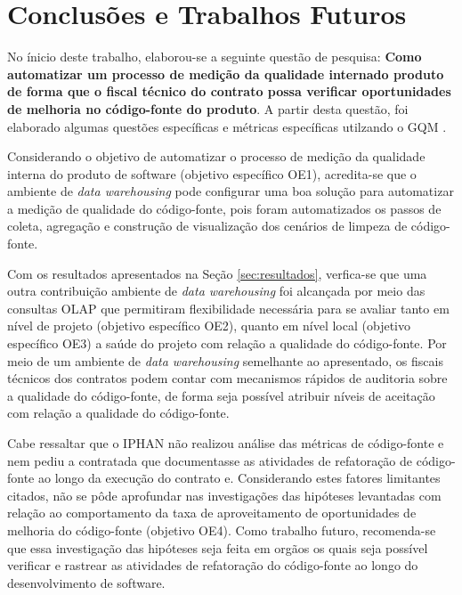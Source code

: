\section{Conclusões e Trabalhos Futuros}

No ínicio deste trabalho, elaborou-se a seguinte questão de pesquisa: \textbf{Como automatizar um processo de medição da qualidade internado produto de forma que o fiscal técnico do contrato possa verificar oportunidades de melhoria no código-fonte do produto}. A partir desta questão, foi elaborado algumas questões específicas e métricas específicas utilzando o GQM \cite{Basili96b}.

Considerando o objetivo de automatizar o processo de medição da qualidade interna do produto de software (objetivo específico OE1), acredita-se que o ambiente de \textit{data warehousing} pode configurar uma boa solução para automatizar a medição de qualidade do código-fonte, pois foram automatizados os passos de coleta, agregação e construção de visualização dos cenários de limpeza de código-fonte.

Com os resultados apresentados na Seção \ref{sec:resultados}, verfica-se que uma outra contribuição ambiente de \textit{data warehousing} foi alcançada por meio das consultas OLAP que permitiram flexibilidade necessária para se avaliar tanto em nível de projeto (objetivo específico OE2), quanto em nível local (objetivo específico OE3) a saúde do projeto com relação a qualidade do código-fonte. Por meio de um ambiente de \textit{data warehousing} semelhante ao apresentado, os fiscais técnicos dos contratos podem contar com mecanismos rápidos de auditoria sobre a qualidade do código-fonte, de forma seja possível atribuir níveis de aceitação com relação a qualidade do código-fonte. 

Cabe ressaltar que o IPHAN não realizou análise das métricas de código-fonte e nem pediu a contratada que documentasse as atividades de refatoração de código-fonte ao longo da execução do contrato e. Considerando estes fatores limitantes citados, não se pôde aprofundar nas investigações das hipóteses levantadas com relação ao comportamento da taxa de aproveitamento de oportunidades de melhoria do código-fonte (objetivo OE4). Como trabalho futuro, recomenda-se que essa investigação das hipóteses seja feita em orgãos os quais seja possível verificar e rastrear as atividades de refatoração do código-fonte ao longo do desenvolvimento de software.